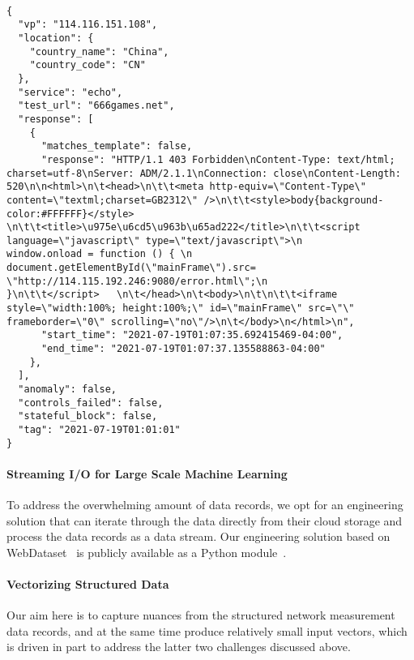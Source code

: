 \begin{lstlisting}[float=tbh, style=jsonstyle, % 
caption={An example of HyperQuack test data record. We truncated the record to save
space. The response field is an array, and as such, an actual record can have multiple response bodies, where each response body corresponds to a block page; however, 
we transform each of those records to multiple records, each of which has a single 
response body. See Section~\ref{sec:eval:data} for detailed discussion.}, %
label=fig:quack:data]

{
  "vp": "114.116.151.108",
  "location": {
    "country_name": "China",
    "country_code": "CN"
  },
  "service": "echo",
  "test_url": "666games.net",
  "response": [
    {
      "matches_template": false,
      "response": "HTTP/1.1 403 Forbidden\nContent-Type: text/html; charset=utf-8\nServer: ADM/2.1.1\nConnection: close\nContent-Length: 520\n\n<html>\n\t<head>\n\t\t<meta http-equiv=\"Content-Type\" content=\"textml;charset=GB2312\" />\n\t\t<style>body{background-color:#FFFFFF}</style> \n\t\t<title>\u975e\u6cd5\u963b\u65ad222</title>\n\t\t<script language=\"javascript\" type=\"text/javascript\">\n         window.onload = function () { \n           document.getElementById(\"mainFrame\").src= \"http://114.115.192.246:9080/error.html\";\n            }\n\t\t</script>   \n\t</head>\n\t<body>\n\t\n\t\t<iframe style=\"width:100%; height:100%;\" id=\"mainFrame\" src=\"\" frameborder=\"0\" scrolling=\"no\"/>\n\t</body>\n</html>\n",
      "start_time": "2021-07-19T01:07:35.692415469-04:00",
      "end_time": "2021-07-19T01:07:37.135588863-04:00"
    },
  ],
  "anomaly": false,
  "controls_failed": false,
  "stateful_block": false,
  "tag": "2021-07-19T01:01:01"
}
\end{lstlisting}

\paragraph{Streaming I/O for Large Scale Machine Learning} To address the
overwhelming amount of data records, we opt for an engineering solution that can
iterate through the data directly from their cloud storage and process the data
records as a data stream. Our engineering solution based on
WebDataset~\cite{aizman_high_2019} is publicly available as a Python
module~\cite{shawn_p_duncan_censored_2022}.  

\paragraph{Vectorizing Structured Data}
Our aim here is to capture nuances from the structured network measurement data records, and at the same time produce relatively small input vectors, which is driven in part to address the latter two challenges discussed above. 

